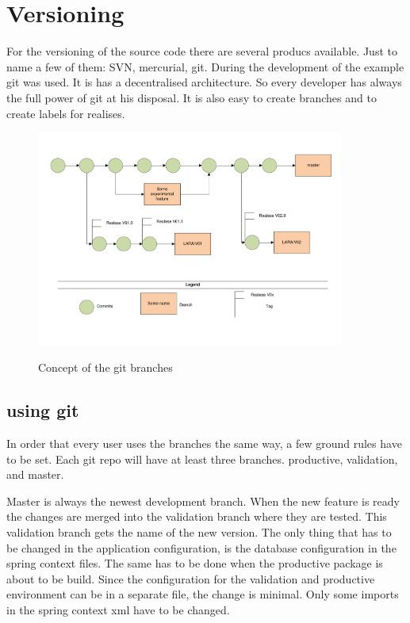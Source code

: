 \documentclass[paper=a4,twoside=false,BCOR=0mm,DIV=calc,fontsize=12pt]{scrartcl}
\begin{document}
\section{Versioning}
For the versioning of the source code there are several producs available. Just to name a few of them: SVN, mercurial, git.
During the development of the example git was used. It is has a decentralised architecture. So every developer has always the full power of git at his disposal. It is also easy to create branches and to create labels for realises.

\begin{figure}
    \begin{center}
       \includegraphics[width=0.9\textwidth]{./img/gitversioning.pdf}\\
    \end{center}
  \caption{Concept of the git branches}
  \label{gitbranchconcept}
\end{figure} 

\subsection{using git}
In order that every user uses the branches the same way, a few ground rules have to be set.
Each git repo will have at least three branches. productive, validation, and master.

Master is always the newest development branch. When the new feature is ready the changes are merged into the validation branch where they are tested. This validation branch gets the name of the new version.
The only thing that has to be changed in the application configuration, is the database configuration in the spring context files.
The same has to be done when the productive package is about to be build. Since the configuration for the validation and productive 
environment can be in a separate file, the change is minimal. Only some imports in the spring context xml have to be changed.
\end{document}
